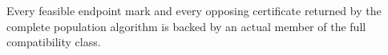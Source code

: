 Every feasible endpoint mark and every opposing certificate returned by the complete population algorithm is backed by an actual member of the full compatibility class.